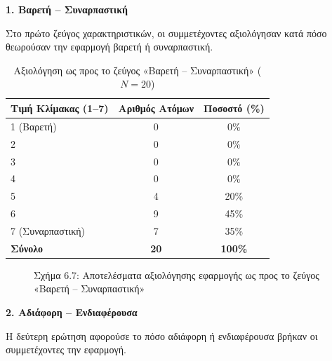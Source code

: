 \documentclass[twoside, a4paper, 11pt]{article}
\begin{document}
\vspace{1em}
\noindent\textbf{1. Βαρετή – Συναρπαστική}

Στο πρώτο ζεύγος χαρακτηριστικών, οι συμμετέχοντες αξιολόγησαν κατά πόσο θεωρούσαν την εφαρμογή βαρετή ή συναρπαστική.

\begin{table}[H]
    \centering
    \caption{Αξιολόγηση ως προς το ζεύγος «Βαρετή – Συναρπαστική» ($N = 20$)}
    \begin{tabular}{|l|c|c|}
        \hline
        \textbf{Τιμή Κλίμακας (1–7)} & \textbf{Αριθμός Ατόμων} & \textbf{Ποσοστό (\%)} \\ \hline
        1 (Βαρετή) & 0 & 0\% \\ \hline
        2 & 0 & 0\% \\ \hline
        3 & 0 & 0\% \\ \hline
        4 & 0 & 0\% \\ \hline
        5 & 4 & 20\% \\ \hline
        6 & 9 & 45\% \\ \hline
        7 (Συναρπαστική) & 7 & 35\% \\ \hline
        \textbf{Σύνολο} & \textbf{20} & \textbf{100\%} \\ \hline
    \end{tabular}
\end{table}

\begin{figure}[H]
    \centering
    \caption{Σχήμα 6.7: Αποτελέσματα αξιολόγησης εφαρμογής ως προς το ζεύγος «Βαρετή – Συναρπαστική»}
\end{figure}

\vspace{1em}
\noindent\textbf{2. Αδιάφορη – Ενδιαφέρουσα}

Η δεύτερη ερώτηση αφορούσε το πόσο αδιάφορη ή ενδιαφέρουσα βρήκαν οι συμμετέχοντες την εφαρμογή.
\end{document}
